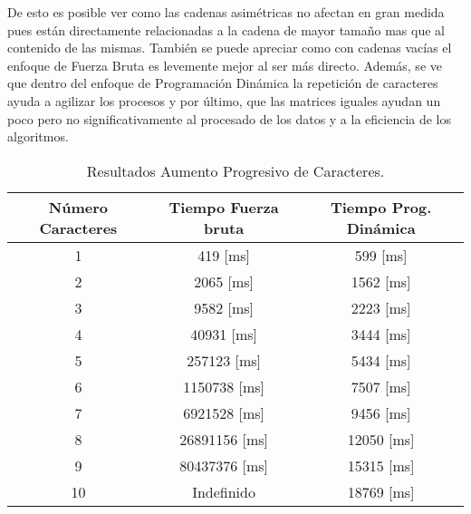 De esto es posible ver como las cadenas asimétricas no afectan en gran medida pues están directamente relacionadas a la cadena de mayor tamaño mas que al contenido de las mismas. También se puede apreciar como con cadenas vacías el enfoque de Fuerza Bruta es levemente mejor al ser más directo. Además, se ve que dentro del enfoque de Programación Dinámica la repetición de caracteres ayuda a agilizar los procesos y por último, que las matrices iguales ayudan un poco pero no significativamente al procesado de los datos y a la eficiencia de los algoritmos.

\begin{table}[h!]
    \centering
    \begin{tabular}{|c|c|c|}
    \hline
    Número Caracteres & Tiempo Fuerza bruta & Tiempo Prog. Dinámica \\ \hline
    1    &  419 [ms]        & 599 [ms]     \\ \hline
    2    &  2065 [ms]       & 1562 [ms]    \\ \hline
    3    &  9582 [ms]       & 2223 [ms]    \\ \hline
    4    &  40931 [ms]      & 3444 [ms]    \\ \hline
    5    &  257123 [ms]     & 5434 [ms]    \\ \hline
    6    &  1150738 [ms]    & 7507  [ms]   \\ \hline
    7    &  6921528 [ms]    & 9456 [ms]    \\ \hline
    8    &  26891156 [ms]   & 12050 [ms]   \\ \hline
    9    &  80437376 [ms]   & 15315 [ms]   \\ \hline
    10   &  Indefinido      & 18769 [ms]   \\ \hline
    \end{tabular}
    \caption{Resultados Aumento Progresivo de Caracteres.}
    \label{tab:resultados2}
\end{table}

\begin{figure}[h!]
    \centering
\end{figure}


